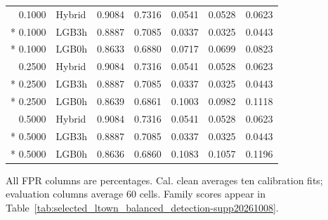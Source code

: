 \begin{longtable}{@{}rlrrrrr@{}}
0.1000 & Hybrid & 0.9084 & 0.7316 & 0.0541 & 0.0528 & 0.0623 \\*
0.1000 & LGB3h & 0.8887 & 0.7085 & 0.0337 & 0.0325 & 0.0443 \\*
0.1000 & LGB0h & 0.8633 & 0.6880 & 0.0717 & 0.0699 & 0.0823 \\
0.2500 & Hybrid & 0.9084 & 0.7316 & 0.0541 & 0.0528 & 0.0623 \\*
0.2500 & LGB3h & 0.8887 & 0.7085 & 0.0337 & 0.0325 & 0.0443 \\*
0.2500 & LGB0h & 0.8639 & 0.6861 & 0.1003 & 0.0982 & 0.1118 \\
0.5000 & Hybrid & 0.9084 & 0.7316 & 0.0541 & 0.0528 & 0.0623 \\*
0.5000 & LGB3h & 0.8887 & 0.7085 & 0.0337 & 0.0325 & 0.0443 \\*
0.5000 & LGB0h & 0.8636 & 0.6860 & 0.1083 & 0.1057 & 0.1196 \\
\end{longtable}
\noindent\footnotesize All FPR columns are percentages. Cal. clean averages ten calibration fits; evaluation columns average 60 cells. Family scores appear in Table~\ref{tab:selected_ltown_balanced_detection-supp20261008}.
\par\endgroup
